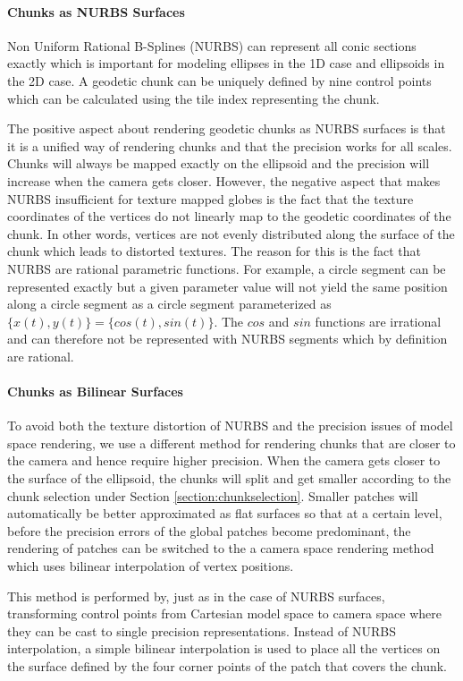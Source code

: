 \paragraph{Chunks as NURBS Surfaces}
Non Uniform Rational B-Splines (NURBS) can represent all conic sections exactly which is important for modeling ellipses in the 1D case and ellipsoids in the 2D case. A geodetic chunk can be uniquely defined by nine control points which can be calculated using the tile index representing the chunk.

The positive aspect about rendering geodetic chunks as NURBS surfaces is that it is a unified way of rendering chunks and that the precision works for all scales. Chunks will always be mapped exactly on the ellipsoid and the precision will increase when the camera gets closer. However, the negative aspect that makes NURBS insufficient for texture mapped globes is the fact that the texture coordinates of the vertices do not linearly map to the geodetic coordinates of the chunk. In other words, vertices are not evenly distributed along the surface of the chunk which leads to distorted textures. The reason for this is the fact that NURBS are rational parametric functions. For example, a circle segment can be represented exactly but a given parameter value will not yield the same position along a circle segment as a circle segment parameterized as $\{x(t),y(t)\} = \{cos(t), sin(t)\}$. The $cos$ and $sin$ functions are irrational and can therefore not be represented with NURBS segments which by definition are rational.

\paragraph{Chunks as Bilinear Surfaces}
To avoid both the texture distortion of NURBS and the precision issues of model space rendering, we use a different method for rendering chunks that are closer to the camera and hence require higher precision. When the camera gets closer to the surface of the ellipsoid, the chunks will split and get smaller according to the chunk selection under Section \ref{section:chunkselection}. Smaller patches will automatically be better approximated as flat surfaces so that at a certain level, before the precision errors of the global patches become predominant, the rendering of patches can be switched to the a camera space rendering method which uses bilinear interpolation of vertex positions.

This method is performed by, just as in the case of NURBS surfaces, transforming control points from Cartesian model space to camera space where they can be cast to single precision representations. Instead of NURBS interpolation, a simple bilinear interpolation is used to place all the vertices on the surface defined by the four corner points of the patch that covers the chunk.


